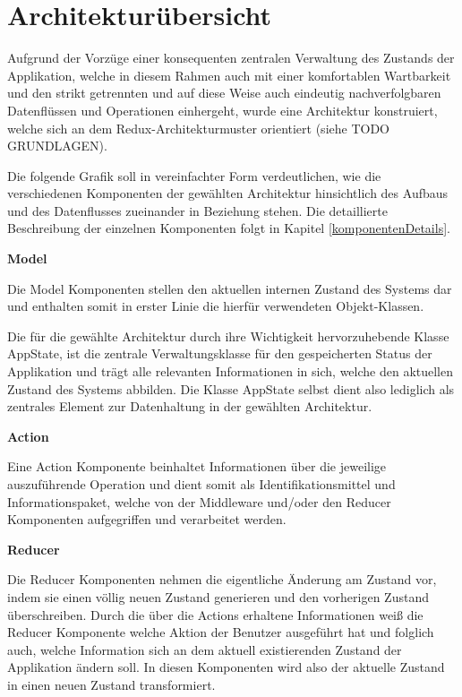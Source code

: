 \documentclass[bibliography=totoc,listof=totoc,BCOR=5mm,DIV=12,oneside]{scrbook}
\begin{document}
\section{Architekturübersicht}
\par Aufgrund der Vorzüge einer konsequenten zentralen Verwaltung des Zustands der Applikation, welche in diesem Rahmen auch mit einer komfortablen Wartbarkeit und den strikt getrennten und auf diese Weise auch eindeutig nachverfolgbaren Datenflüssen und Operationen einhergeht, wurde eine Architektur konstruiert, welche sich an dem Redux-Architekturmuster orientiert (siehe TODO GRUNDLAGEN). 
\par Die folgende Grafik soll in vereinfachter Form verdeutlichen, wie die verschiedenen Komponenten der gewählten Architektur hinsichtlich des Aufbaus und des Datenflusses zueinander in Beziehung stehen. Die detaillierte Beschreibung der einzelnen Komponenten folgt in Kapitel \ref{komponentenDetails}.

\par \bigskip \textbf{Model}
\par Die Model Komponenten stellen den aktuellen internen Zustand des Systems dar und enthalten somit in erster Linie die hierfür verwendeten Objekt-Klassen.
\par Die für die gewählte Architektur durch ihre Wichtigkeit hervorzuhebende Klasse AppState, ist die zentrale Verwaltungsklasse für den gespeicherten Status der Applikation und trägt alle relevanten Informationen in sich, welche den aktuellen Zustand des Systems abbilden. Die Klasse AppState selbst dient also lediglich als zentrales Element zur Datenhaltung in der gewählten Architektur.

\par \bigskip \textbf{Action}
\par Eine Action Komponente beinhaltet Informationen über die jeweilige auszuführende Operation und dient somit als Identifikationsmittel und Informationspaket, welche von der Middleware und/oder den Reducer Komponenten aufgegriffen und verarbeitet werden.

\par \bigskip \textbf{Reducer}
\par Die Reducer Komponenten nehmen die eigentliche Änderung am Zustand vor, indem sie einen völlig neuen Zustand generieren und den vorherigen Zustand überschreiben. Durch die über die Actions erhaltene Informationen weiß die Reducer Komponente welche Aktion der Benutzer ausgeführt hat und folglich auch, welche Information sich an dem aktuell existierenden Zustand der Applikation ändern soll. In diesen Komponenten wird also der aktuelle Zustand in einen neuen Zustand transformiert.
\end{document}
